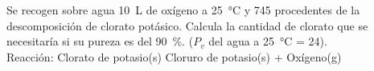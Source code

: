 Se recogen sobre agua \SI{10}{\liter} de oxígeno a \SI{25}{\celsius} y \SI{745}{\torr} procedentes de la descomposición de clorato potásico. Calcula la cantidad de clorato que se necesitaría si su pureza es del \SI{90}{\percent}. ($P_v$ del agua a \SI{25}{\celsius} = \SI{24}{\torr}).\\
	Reacción: Clorato de potasio(s) \ce{->} Cloruro de potasio(s) + Oxígeno(g)
